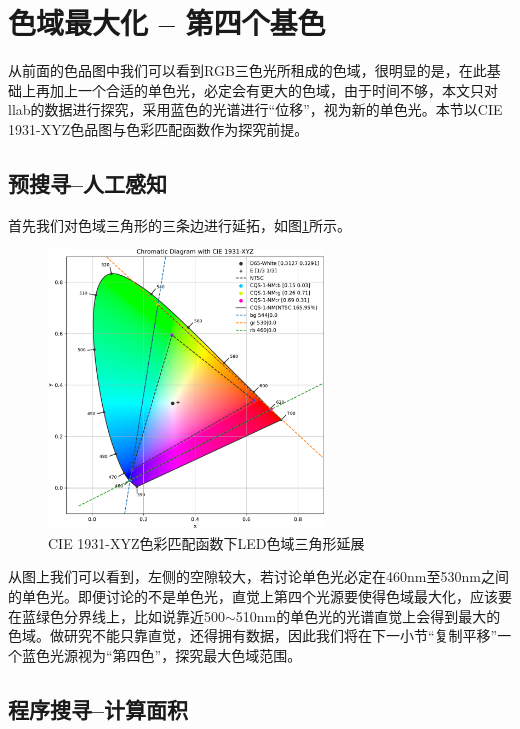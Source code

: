 \section{色域最大化 -- 第四个基色}
从前面的色品图中我们可以看到RGB三色光所租成的色域，很明显的是，在此基础上再加上一个合适的单色光，必定会有更大的色域，由于时间不够，本文只对llab的数据进行探究，采用蓝色的光谱进行``位移''，视为新的单色光。本节以CIE 1931-XYZ色品图与色彩匹配函数作为探究前提。

\subsection{预搜寻--人工感知}

首先我们对色域三角形的三条边进行延拓，如图\ref{fig:sd1931-LINE}所示。

\begin{figure}[htbp]
    \centering
    \includegraphics[width=0.65\textwidth]{./imgs/sec5/CQS-1-NM-1931-Line.pdf}
    \caption{CIE 1931-XYZ色彩匹配函数下LED色域三角形延展}
    \label{fig:sd1931-LINE}
\end{figure}

从图上我们可以看到，左侧的空隙较大，若讨论单色光必定在460nm至530nm之间的单色光。即便讨论的不是单色光，直觉上第四个光源要使得色域最大化，应该要在蓝绿色分界线上，比如说靠近500$\sim$510nm的单色光的光谱直觉上会得到最大的色域。做研究不能只靠直觉，还得拥有数据，因此我们将在下一小节``复制平移''一个蓝色光源视为``第四色''，探究最大色域范围。

\subsection{程序搜寻--计算面积}

